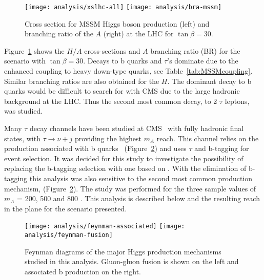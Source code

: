 
\begin{figure}[!Hhtb]
\centering
\texttt{[image: analysis/xslhc-all]}
\texttt{[image: analysis/bra-mssm]}
\caption{Cross section for MSSM Higgs boson production (left) and branching ratio of the $A$ (right) at the LHC for $\tan{\beta}=30$.~\cite{citeulike:888485}  
\label{fig:Higgs_xsection_BR}}
\end{figure}

Figure~\ref{fig:Higgs_xsection_BR} shows the $H/A$ cross-sections and $A$ branching ratio (BR) for the \mhmax scenario with $\tan{\beta} = 30$. Decays to b quarks and $\tau$'s dominate due to the enhanced coupling to heavy down-type quarks, see Table~\ref{tab:MSSMcoupling}. Similar branching ratios are also obtained for the $H$. The dominant decay to b quarks would be difficult to search for with CMS due to the large hadronic background at the LHC. Thus the second most common decay, to 2 $\tau$ leptons, was studied.


Many $\tau$ decay channels have been studied at CMS~\cite{CMS_TDR_PHYS_vol2} with fully hadronic final states, with $\tau \rightarrow \nu + j$ providing the highest $m_{A}$ reach. This channel relies on the production associated with b quarks~\cite{CMS_TDR_PHYS_vol2, citeulike:903864} (Figure~\ref{fig:feynman}) and uses $\tau$ and b-tagging for event selection. It was decided for this study to investigate the possibility of replacing the b-tagging selection with one based on \MET. With the elimination of b-tagging this analysis was also sensitive to the second most common production mechanism, \ggH (Figure~\ref{fig:feynman}). The study was performed for the three sample values of $m_A$ = 200, 500 and 800 \GeVcc. This analysis is described below and the resulting reach in the \plane plane for the \mhmax scenario presented.

\begin{figure}
	\centering
	\texttt{[image: analysis/feynman-associated]}
	\texttt{[image: analysis/feynman-fusion]}
	\caption{Feynman diagrams of the major Higgs production mechanisms studied in this analysis. Gluon-gluon fusion is shown on the left and associated b production on the right.\label{fig:feynman}}
\end{figure}


